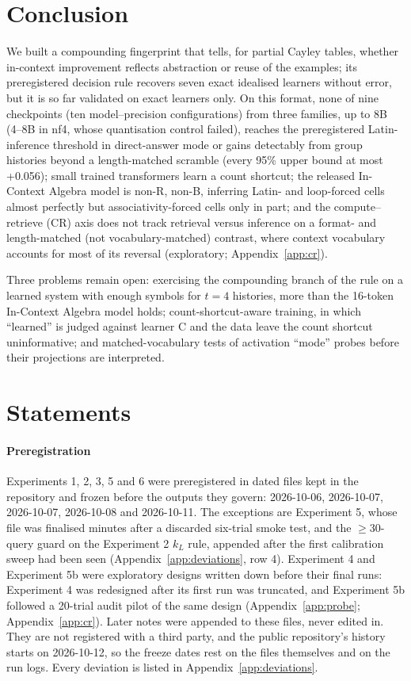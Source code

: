 \documentclass[11pt]{article}
\begin{document}
\section{Conclusion}\label{sec:conclusion}

We built a compounding fingerprint that tells, for partial Cayley tables, whether in-context improvement reflects abstraction or reuse of the examples; its preregistered decision rule recovers seven exact idealised learners without error, but it is so far validated on exact learners only. On this format, none of nine checkpoints (ten model--precision configurations) from three families, up to 8B (4--8B in nf4, whose quantisation control failed), reaches the preregistered Latin-inference threshold in direct-answer mode or gains detectably from group histories beyond a length-matched scramble (every 95\% upper bound at most +0.056); small trained transformers learn a count shortcut; the released In-Context Algebra model is non-R, non-B, inferring Latin- and loop-forced cells almost perfectly but associativity-forced cells only in part; and the compute--retrieve (CR) axis does not track retrieval versus inference on a format- and length-matched (not vocabulary-matched) contrast, where context vocabulary accounts for most of its reversal (exploratory; Appendix~\ref{app:cr}).

Three problems remain open: exercising the compounding branch of the rule on a learned system with enough symbols for $t = 4$ histories, more than the 16-token In-Context Algebra model holds; count-shortcut-aware training, in which ``learned'' is judged against learner C and the data leave the count shortcut uninformative; and matched-vocabulary tests of activation ``mode'' probes before their projections are interpreted.

\section*{Statements}

\paragraph{Preregistration}

Experiments 1, 2, 3, 5 and 6 were preregistered in dated files kept in the repository and frozen before the outputs they govern: 2026-10-06, 2026-10-07, 2026-10-07, 2026-10-08 and 2026-10-11. The exceptions are Experiment 5, whose file was finalised minutes after a discarded six-trial smoke test, and the $\geq 30$-query guard on the Experiment 2 $k_L$ rule, appended after the first calibration sweep had been seen (Appendix~\ref{app:deviations}, row 4). Experiment 4 and Experiment 5b were exploratory designs written down before their final runs: Experiment 4 was redesigned after its first run was truncated, and Experiment 5b followed a 20-trial audit pilot of the same design (Appendix~\ref{app:probe}; Appendix~\ref{app:cr}). Later notes were appended to these files, never edited in. They are not registered with a third party, and the public repository's history starts on 2026-10-12, so the freeze dates rest on the files themselves and on the run logs. Every deviation is listed in Appendix~\ref{app:deviations}.
\end{document}
